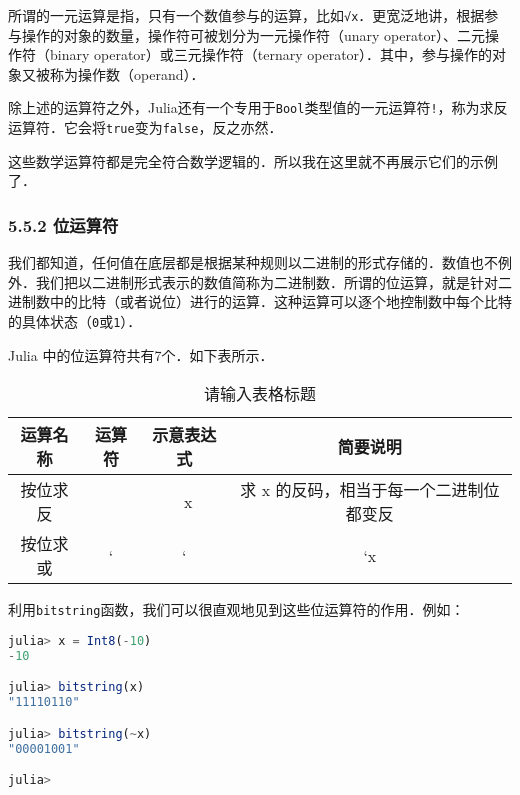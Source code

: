 所谓的一元运算是指，只有一个数值参与的运算，比如\verb|√x|．更宽泛地讲，根据参与操作的对象的数量，操作符可被划分为一元操作符（unary operator）、二元操作符（binary operator）或三元操作符（ternary operator）．其中，参与操作的对象又被称为操作数（operand）．

除上述的运算符之外，Julia还有一个专用于\verb|Bool|类型值的一元运算符\verb|!|，称为求反运算符．它会将\verb|true|变为\verb|false|，反之亦然．

这些数学运算符都是完全符合数学逻辑的．所以我在这里就不再展示它们的示例了．

\subsubsection{5.5.2 位运算符}

我们都知道，任何值在底层都是根据某种规则以二进制的形式存储的．数值也不例外．我们把以二进制形式表示的数值简称为二进制数．所谓的位运算，就是针对二进制数中的比特（或者说位）进行的运算．这种运算可以逐个地控制数中每个比特的具体状态（\verb|0|或\verb|1|）．

Julia 中的位运算符共有7个．如下表所示．
\begin{table}[ht]
\centering
\caption{请输入表格标题}\label{JuC5S5_tab4}
\begin{tabular}{|c|c|c|c|}
\hline
运算名称 & 运算符 & 示意表达式 & 简要说明 \\
\hline
按位求反 & ~ & ~x & 求 x 的反码，相当于每一个二进制位都变反 \\
\hline
按位求或& ` & ` & `x \\
\hline
\end{tabular}
\end{table}

利用\verb|bitstring|函数，我们可以很直观地见到这些位运算符的作用．例如：
\begin{lstlisting}[language=julia]
julia> x = Int8(-10)
-10

julia> bitstring(x)
"11110110"

julia> bitstring(~x)
"00001001"

julia> 
\end{lstlisting}

